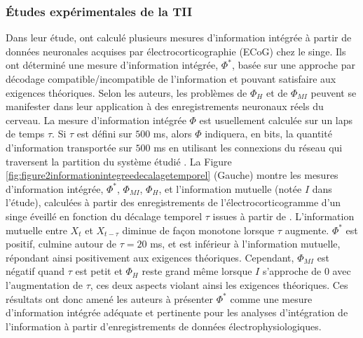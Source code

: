 \subsubsection{Études expérimentales de la TII}

Dans leur étude, \cite{oizumi2016measuring} ont calculé plusieurs mesures d'information intégrée à partir de données neuronales acquises par électrocorticographie (ECoG) chez le singe. 
Ils ont déterminé une mesure d'information intégrée, $\Phi^*$, basée sur une approche par décodage compatible/incompatible de l'information et pouvant satisfaire aux exigences théoriques. 
Selon les auteurs, les problèmes de $\Phi_H$ et de $\Phi_{MI}$ peuvent se manifester dans leur application à des enregistrements neuronaux réels du cerveau. 
La mesure d'information intégrée $\Phi$ est usuellement calculée sur un laps de temps $\tau$. 
Si $\tau$ est défini sur $500$ ms, alors $\Phi$ indiquera, en bits, la quantité d'information transportée sur $500$ ms en utilisant les connexions du réseau qui traversent la partition du système étudié \citep{toker2019information}. 
La Figure \ref{fig:figure2informationintegreedecalagetemporel} (Gauche) montre les mesures d'information intégrée, $\Phi^*$, $\Phi_{MI}$, $\Phi_H$, et l'information mutuelle (notée $I$ dans l'étude), calculées à partir des enregistrements de l'électrocorticogramme d'un singe éveillé en fonction du décalage temporel $\tau$ issues à partir de \cite{oizumi2016measuring}. 
L'information mutuelle entre $X_t$ et $X_{t-\tau}$ diminue de façon monotone lorsque $\tau$ augmente. 
$\Phi^*$ est positif, culmine autour de $\tau=20$ ms, et est inférieur à l'information mutuelle, répondant ainsi positivement aux exigences théoriques. 
Cependant, $\Phi_{MI}$ est négatif quand $\tau$ est petit et $\Phi_H$ reste grand même lorsque $I$ s'approche de $0$ avec l'augmentation de $\tau$, ces deux aspects violant ainsi les exigences théoriques. 
Ces résultats ont donc amené les auteurs à présenter $\Phi^*$ comme une mesure d'information intégrée adéquate et pertinente pour les analyses d'intégration de l'information à partir d'enregistrements de données électrophysiologiques. 

